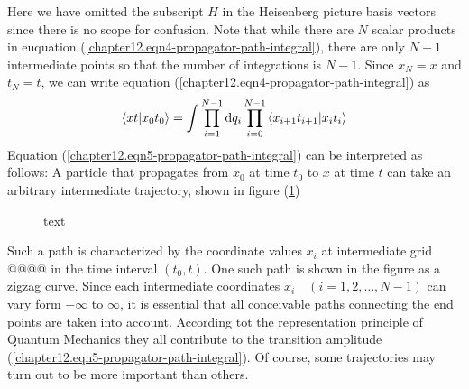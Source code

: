 \begin{enumerate}
		Here we have omitted the subscript $H$ in the Heisenberg picture basis vectors since there is no scope for confusion. Note that while there are $N$ scalar products in euquation (\ref{chapter12.eqn4-propagator-path-integral}), there are only $N-1$ intermediate points so that the number of integrations is $N-1$. Since $x_N = x$ and $t_N= t$, we can write equation (\ref{chapter12.eqn4-propagator-path-integral}) as
		\begin{equation}
			\braket{x t}{x_0 t_0} = \int \prod_{i=1}^{N-1} \dd{q_i} \prod_{i=0}^{N-1} \braket{x_{i+1} t_{i+1}}{x_i t_i}
			\label{chapter12.eqn5-propagator-path-integral}
		\end{equation}
		Equation (\ref{chapter12.eqn5-propagator-path-integral}) can be interpreted as follows: A particle that propagates from $x_0$ at time $t_0$ to $x$ at time $t$ can take an arbitrary intermediate trajectory, shown in figure (\ref{chapter12.fig1-propagator-path-integral-trajectory})
		\begin{figure}
			\centering
			\caption{text}
			\label{chapter12.fig1-propagator-path-integral-trajectory}
		\end{figure}
	Such a path is characterized by the coordinate values $x_i$ at intermediate grid @@@@ in the time interval $(t_0,t)$. One such path is shown in the figure as a zigzag curve. Since each intermediate coordinates $x_i\quad (i=1,2,\ldots,N-1)$ can vary form $-\infty$ to $\infty$, it is essential that all conceivable paths connecting the end points are taken into account. According tot the representation principle of Quantum Mechanics they all contribute to the transition amplitude (\ref{chapter12.eqn5-propagator-path-integral}). Of course, some trajectories may turn out to be more important than others.\\
	

\end{enumerate}
